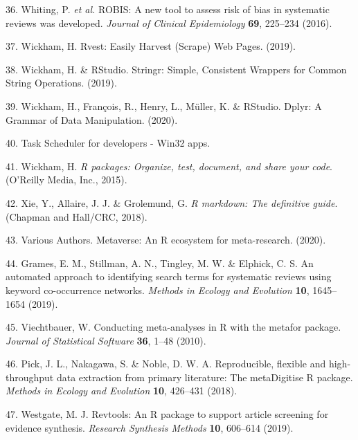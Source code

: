 \documentclass[a4paper, nobind]{templates/ociamthesis}
\begin{document}
\leavevmode\hypertarget{ref-whiting2016robis}{}%
36. Whiting, P. \emph{et al.} ROBIS: A new tool to assess risk of bias in systematic reviews was developed. \emph{Journal of Clinical Epidemiology} \textbf{69}, 225--234 (2016).

\leavevmode\hypertarget{ref-wickham2019}{}%
37. Wickham, H. Rvest: Easily Harvest (Scrape) Web Pages. (2019).

\leavevmode\hypertarget{ref-wickham2019a}{}%
38. Wickham, H. \& RStudio. Stringr: Simple, Consistent Wrappers for Common String Operations. (2019).

\leavevmode\hypertarget{ref-wickham2020}{}%
39. Wickham, H., François, R., Henry, L., Müller, K. \& RStudio. Dplyr: A Grammar of Data Manipulation. (2020).

\leavevmode\hypertarget{ref-zotero-880}{}%
40. Task Scheduler for developers - Win32 apps.

\leavevmode\hypertarget{ref-wickham2015r}{}%
41. Wickham, H. \emph{R packages: Organize, test, document, and share your code}. (O'Reilly Media, Inc., 2015).

\leavevmode\hypertarget{ref-xie2018r}{}%
42. Xie, Y., Allaire, J. J. \& Grolemund, G. \emph{R markdown: The definitive guide}. (Chapman and Hall/CRC, 2018).

\leavevmode\hypertarget{ref-variousauthors2020}{}%
43. Various Authors. Metaverse: An R ecosystem for meta-research. (2020).

\leavevmode\hypertarget{ref-grames2019automated}{}%
44. Grames, E. M., Stillman, A. N., Tingley, M. W. \& Elphick, C. S. An automated approach to identifying search terms for systematic reviews using keyword co-occurrence networks. \emph{Methods in Ecology and Evolution} \textbf{10}, 1645--1654 (2019).

\leavevmode\hypertarget{ref-metaforref}{}%
45. Viechtbauer, W. Conducting meta-analyses in R with the metafor package. \emph{Journal of Statistical Software} \textbf{36}, 1--48 (2010).

\leavevmode\hypertarget{ref-pick2018}{}%
46. Pick, J. L., Nakagawa, S. \& Noble, D. W. A. Reproducible, flexible and high-throughput data extraction from primary literature: The metaDigitise R package. \emph{Methods in Ecology and Evolution} \textbf{10}, 426--431 (2018).

\leavevmode\hypertarget{ref-westgate2019revtools}{}%
47. Westgate, M. J. Revtools: An R package to support article screening for evidence synthesis. \emph{Research Synthesis Methods} \textbf{10}, 606--614 (2019).
\end{document}
